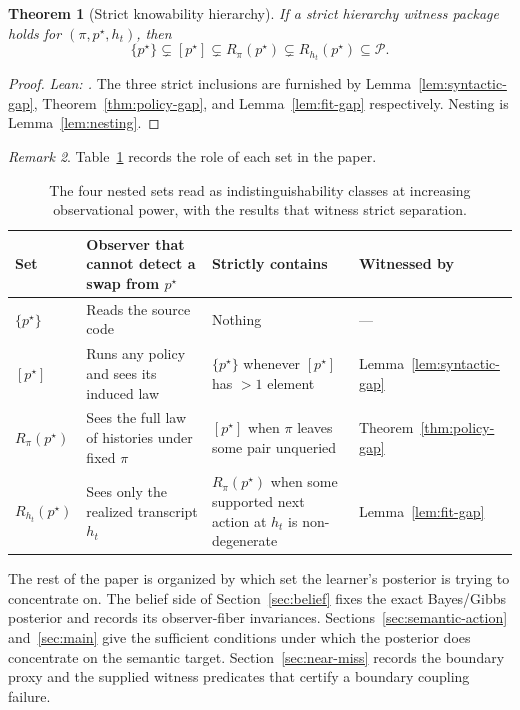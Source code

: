 \documentclass[11pt]{article}
\newtheorem{theorem}{Theorem}[section]
\theoremstyle{definition}
\theoremstyle{remark}
\newtheorem{remark}[theorem]{Remark}
\theoremstyle{plain}
\theoremstyle{definition}
\newcommand{\Pcal}{\mathcal{P}}
\begin{document}
\begin{theorem}[Strict knowability hierarchy]
\label{thm:strict-hierarchy}
If a strict hierarchy witness package holds for $(\pi,p^\star,h_t)$, then
\[
\{p^\star\}\subsetneq [p^\star]\subsetneq R_\pi(p^\star)\subsetneq R_{h_t}(p^\star)\subseteq \Pcal.
\]
\end{theorem}

\begin{proof}
\noindent\emph{Lean: .}
The three strict inclusions are furnished by Lemma~\ref{lem:syntactic-gap}, Theorem~\ref{thm:policy-gap}, and Lemma~\ref{lem:fit-gap} respectively. Nesting is Lemma~\ref{lem:nesting}.
\end{proof}

\begin{remark}
Table~\ref{tab:hierarchy} records the role of each set in the paper.
\end{remark}

\begin{table}[ht]
\centering
\small
\caption{The four nested sets read as indistinguishability classes at increasing observational power, with the results that witness strict separation.}
\label{tab:hierarchy}
\begin{tabularx}{\textwidth}{@{}>{\raggedright\arraybackslash}p{}>{\raggedright\arraybackslash}p{}>{\raggedright\arraybackslash}X>{\raggedright\arraybackslash}p{}@{}}
\toprule
\textbf{Set} & \textbf{Observer that cannot detect a swap from $p^\star$} & \textbf{Strictly contains} & \textbf{Witnessed by} \\
\midrule
$\{p^\star\}$ & Reads the source code & Nothing & --- \\
$[p^\star]$ & Runs any policy and sees its induced law & $\{p^\star\}$ whenever $[p^\star]$ has $>1$ element & Lemma~\ref{lem:syntactic-gap} \\
$R_\pi(p^\star)$ & Sees the full law of histories under fixed $\pi$ & $[p^\star]$ when $\pi$ leaves some pair unqueried & Theorem~\ref{thm:policy-gap} \\
$R_{h_t}(p^\star)$ & Sees only the realized transcript $h_t$ & $R_\pi(p^\star)$ when some supported next action at $h_t$ is non-degenerate & Lemma~\ref{lem:fit-gap} \\
\bottomrule
\end{tabularx}
\end{table}

The rest of the paper is organized by which set the learner's posterior is trying to concentrate on. The belief side of Section~\ref{sec:belief} fixes the exact Bayes/Gibbs posterior and records its observer-fiber invariances. Sections~\ref{sec:semantic-action} and~\ref{sec:main} give the sufficient conditions under which the posterior does concentrate on the semantic target. Section~\ref{sec:near-miss} records the boundary proxy and the supplied witness predicates that certify a boundary coupling failure.
\end{document}
